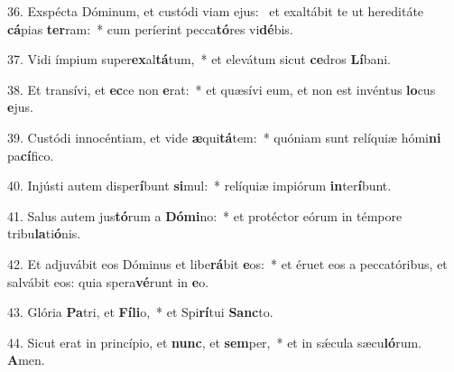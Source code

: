 36. Exspécta Dóminum, et custódi viam ejus: \dag\  et exaltábit te ut hereditáte \textbf{cá}pias \textbf{ter}ram:~*  cum períerint pecca\textbf{tó}res vi\textbf{dé}bis.\

37. Vidi ímpium super\textbf{ex}al\textbf{tá}tum,~*  et elevátum sicut \textbf{ce}dros \textbf{Lí}bani.\

38. Et transívi, et \textbf{ec}ce non \textbf{e}rat:~*  et quæsívi eum, et non est invéntus \textbf{lo}cus \textbf{e}jus.\

39. Custódi innocéntiam, et vide \textbf{æ}qui\textbf{tá}tem:~*  quóniam sunt relíquiæ hómi\textbf{ni} pa\textbf{cí}fico.\

40. Injústi autem disper\textbf{í}bunt \textbf{si}mul:~*  relíquiæ impiórum \textbf{in}ter\textbf{í}bunt.\

41. Salus autem jus\textbf{tó}rum a \textbf{Dó}\textbf{mi}no:~*  et protéctor eórum in témpore tribu\textbf{la}ti\textbf{ó}nis.\

42. Et adjuvábit eos Dóminus et libe\textbf{rá}bit \textbf{e}os:~*  et éruet eos a peccatóribus, et salvábit eos: quia spera\textbf{vé}runt in \textbf{e}o.\

43. Glória \textbf{Pa}tri, et \textbf{Fí}\textbf{li}o,~*  et Spi\textbf{rí}tui \textbf{Sanc}to.\

44. Sicut erat in princípio, et \textbf{nunc}, et \textbf{sem}per,~*  et in sǽcula sæcu\textbf{ló}rum. \textbf{A}men.\


